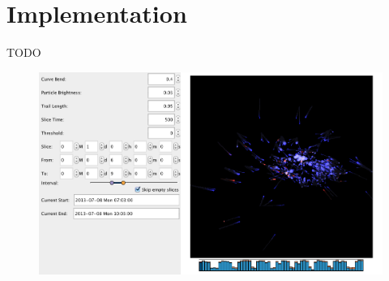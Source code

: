 \section{Implementation}
\label{sec:impl}
TODO

\begin{figure}
\centering
\includegraphics[width=\linewidth]{images/tool.png}
\end{figure}
